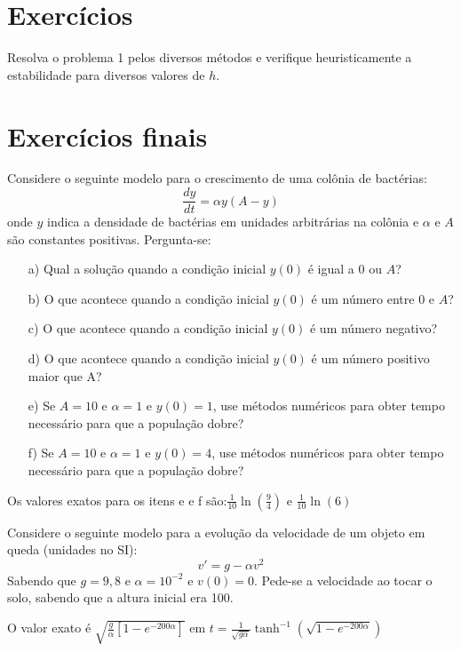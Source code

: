 \section*{Exercícios}

\begin{Exercise} Resolva o problema 1 pelos diversos métodos e verifique heuristicamente a estabilidade para diversos valores de $h$.
\end{Exercise}

\section{Exercícios finais}

\begin{Exercise} Considere o seguinte modelo para o crescimento de uma colônia de bactérias:
$$\frac{dy}{dt}=\alpha y (A-y)$$
onde $y$ indica a densidade de bactérias em unidades arbitrárias na colônia e $\alpha$ e $A$ são constantes positivas.
Pergunta-se:
\begin{itemize}
\item[a)] Qual a solução quando a condição inicial $y(0)$ é igual a $0$ ou $A$?
\item[b)] O que acontece quando a condição inicial $y(0)$ é um número entre $0$ e $A$?
\item[c)] O que acontece quando a condição inicial $y(0)$ é um número negativo?
\item[d)] O que acontece quando a condição inicial $y(0)$ é um número positivo maior que A?
\item[e)] Se $A=10$ e $\alpha=1$ e $y(0)=1$, use métodos numéricos para obter tempo necessário para que a população dobre?
\item[f)] Se $A=10$ e $\alpha=1$ e $y(0)=4$, use métodos numéricos para obter tempo necessário para que a população dobre?
\end{itemize}
\end{Exercise}
\begin{Answer}
  \begin{tiny}
Os valores exatos para os itens e e f são:$\frac{1}{10}\ln\left(\frac{9}{4}\right)$ e $\frac{1}{10}\ln\left(6\right)$    
  \end{tiny}
\end{Answer}

\begin{Exercise} Considere o seguinte modelo para a evolução da velocidade de um objeto em queda (unidades no SI):
$$v'=g-\alpha v^2$$
Sabendo que $g=9,8$ e $\alpha=10^{-2}$ e $v(0)=0$. Pede-se a velocidade ao tocar o solo, sabendo que a altura inicial era 100.

\end{Exercise}
\begin{Answer}
  \begin{tiny}
O valor exato é $\sqrt{\frac{g}{\alpha}\left[1-e^{{-200\alpha}}\right]}$ em $t=\frac{1}{\sqrt{g\alpha}}\tanh^{-1}\left(\sqrt{1-e^{{-200\alpha}}}\right)$    
  \end{tiny}
\end{Answer}



